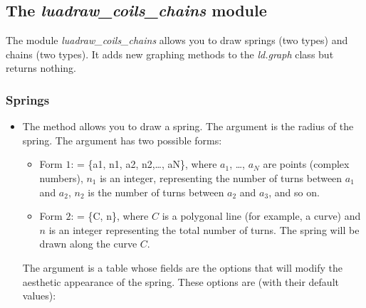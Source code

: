 \subsection{The \emph{luadraw\_coils\_chains} module}

The module \emph{luadraw\_coils\_chains} allows you to draw springs (two types) and chains (two types).
It adds new graphing methods to the \emph{ld.graph} class but returns nothing.

\subsubsection{Springs}

\begin{itemize}
    \item The method  allows you to draw a spring. The argument  is the radius of the spring. The argument  has two possible forms:
    \begin{itemize}
        \item Form $1$:  = \{a1, ​​n1, a2, n2,\ldots, aN\}, where $a_1$, \ldots, $a_N$ are points (complex numbers), $n_1$ is an integer, representing the number of turns between $a_1$ and $a_2$, $n_2$ is the number of turns between $a_2$ and $a_3$, and so on.

        \item Form $2$:  = \{C, n\}, where $C$ is a polygonal line (for example, a curve) and $n$ is an integer representing the total number of turns. The spring will be drawn along the curve $C$.
    \end{itemize}

    The  argument is a table whose fields are the options that will modify the aesthetic appearance of the spring. These options are (with their default values):
    

\end{itemize}
